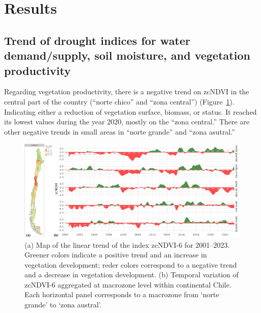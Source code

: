 \documentclass[
  number,
  preprint,
  3p]{elsarticle}
\begin{document}
\hypertarget{results}{%
\section{Results}\label{results}}

\hypertarget{trend-of-drought-indices-for-water-demandsupply-soil-moisture-and-vegetation-productivity}{%
\subsection{Trend of drought indices for water demand/supply, soil
moisture, and vegetation
productivity}\label{trend-of-drought-indices-for-water-demandsupply-soil-moisture-and-vegetation-productivity}}

Regarding vegetation productivity, there is a negative trend on zcNDVI
in the central part of the country (``norte chico'' and ``zona
central'') (Figure~\ref{fig-zcNDVI_var}). Indicating either a reduction
of vegetation surface, biomass, or status. It reached its lowest values
during the year 2020, mostly on the ``zona central.'' There are other
negative trends in small areas in ``norte grande'' and ``zona asutral.''

\begin{figure}[!ht]

{\centering \includegraphics{../output/figs/temporal_variation_zcNDVI6_macrozonas.png}

}

\caption{\label{fig-zcNDVI_var}(a) Map of the linear trend of the index
zcNDVI-6 for 2001--2023. Greener colors indicate a positive trend and an
increase in vegetation development; reder colors correspond to a
negative trend and a decrease in vegetation development. (b) Temporal
variation of zcNDVI-6 aggregated at macrozone level within continental
Chile. Each horizontal panel corresponds to a macrozone from `norte
grande' to `zona austral'.}

\end{figure}
\end{document}
